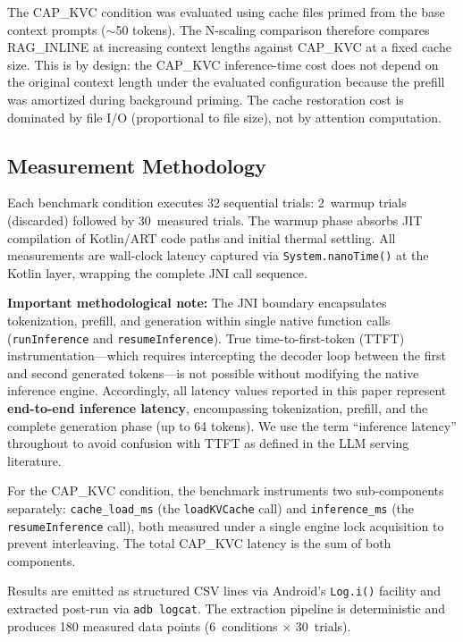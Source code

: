 The CAP\_KVC condition was evaluated using cache files primed from the base context prompts ($\sim$50 tokens). The N-scaling comparison therefore compares RAG\_INLINE at increasing context lengths against CAP\_KVC at a fixed cache size. This is by design: the CAP\_KVC inference-time cost does not depend on the original context length under the evaluated configuration because the prefill was amortized during background priming. The cache restoration cost is dominated by file I/O (proportional to file size), not by attention computation.

\subsection{Measurement Methodology}
\label{sec:measurement}

Each benchmark condition executes 32 sequential trials: 2~warmup trials (discarded) followed by 30~measured trials. The warmup phase absorbs JIT compilation of Kotlin/ART code paths and initial thermal settling. All measurements are wall-clock latency captured via \texttt{System.nanoTime()} at the Kotlin layer, wrapping the complete JNI call sequence.

\textbf{Important methodological note:} The JNI boundary encapsulates tokenization, prefill, and generation within single native function calls (\texttt{runInference} and \texttt{resumeInference}). True time-to-first-token (TTFT) instrumentation---which requires intercepting the decoder loop between the first and second generated tokens---is not possible without modifying the native inference engine. Accordingly, all latency values reported in this paper represent \textbf{end-to-end inference latency}, encompassing tokenization, prefill, and the complete generation phase (up to 64 tokens). We use the term ``inference latency'' throughout to avoid confusion with TTFT as defined in the LLM serving literature.

For the CAP\_KVC condition, the benchmark instruments two sub-components separately: \texttt{cache\_load\_ms} (the \texttt{loadKVCache} call) and \texttt{inference\_ms} (the \texttt{resumeInference} call), both measured under a single engine lock acquisition to prevent interleaving. The total CAP\_KVC latency is the sum of both components.

Results are emitted as structured CSV lines via Android's \texttt{Log.i()} facility and extracted post-run via \texttt{adb logcat}. The extraction pipeline is deterministic and produces 180 measured data points (6~conditions $\times$ 30~trials).

